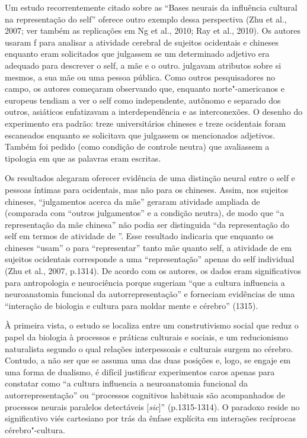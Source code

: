 Um estudo recorrentemente citado sobre as ``Bases neurais da influência
cultural na representação do self'' oferece outro exemplo dessa
perspectiva (Zhu et al., 2007; ver também as replicações em Ng et al.,
2010; Ray et al., 2010). Os autores usaram f para analisar a
atividade cerebral de sujeitos ocidentais e chineses enquanto eram
solicitados que julgassem se um determinado adjetivo era adequado para
descrever o self, a mãe e o outro. julgavam atributos sobre si mesmos, a
sua mãe ou uma pessoa pública. Como outros pesquisadores no campo, os
autores começaram observando que, enquanto norte"-americanos e europeus
tendiam a ver o self como independente, autônomo e separado dos outros,
asiáticos enfatizavam a interdependência e as interconexões. O desenho
do experimento era padrão: treze universitários chineses e treze
ocidentais foram escaneados enquanto se solicitava que julgassem os
mencionados adjetivos. Também foi pedido (como condição de controle
neutra) que avaliassem a tipologia em que as palavras eram escritas.

Os resultados alegaram oferecer evidência de uma distinção neural entre
o self e pessoas íntimas para ocidentais, mas não para os chineses.
Assim, nos sujeitos chineses, ``julgamentos acerca da mãe'' geraram
atividade ampliada de  (comparada com ``outros julgamentos'' e a
condição neutra), de modo que ``a representação da mãe chinesa'' não
podia ser distinguida ``da representação do self em termos de atividade
de ''. Esse resultado indicaria que enquanto os chineses ``usam'' o
 para ``representar'' tanto mãe quanto self, a atividade de  em
sujeitos ocidentais corresponde a uma ``representação'' apenas do self
individual (Zhu et al., 2007, p.1314). De acordo com os autores, os
dados eram significativos para antropologia e neurociência porque
sugeriam ``que a cultura influencia a neuroanatomia funcional da
autorrepresentação'' e forneciam evidências de uma ``interação de
biologia e cultura para moldar mente e cérebro'' (1315).

À primeira vista, o estudo se localiza entre um construtivismo social
que reduz o papel da biologia à processos e práticas culturais e
sociais, e um reducionismo naturalista segundo o qual relações
interpessoais e culturais surgem no cérebro. Contudo, a não ser que se
assuma uma das duas posições e, logo, se engaje em uma forma de
dualismo, é difícil justificar experimentos caros apenas para constatar
como ``a cultura influencia a neuroanatomia funcional da
autorrepresentação'' ou ``processos cognitivos habituais são
acompanhados de processos neurais paralelos detectáveis
{[}\emph{sic}{]}'' (p.1315-1314). O paradoxo reside no significativo
viés cartesiano por trás da ênfase explícita em interações recíprocas
cérebro"-cultura.


